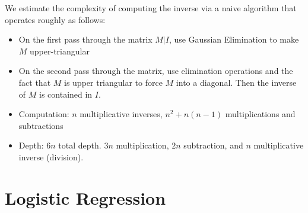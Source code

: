 We estimate the complexity of computing the inverse via a naive algorithm that operates roughly as follows:
\begin{itemize}
	\item On the first pass through the matrix $M | I$, use Gaussian Elimination to make $M$ upper-triangular
	\item On the second pass through the matrix, use elimination operations and the fact that $M$ is upper triangular  to force $M$ into a diagonal. Then the inverse of $M$ is contained in $I$.
\end{itemize}


\begin{itemize}
	\item Computation: $n$ multiplicative inverses, $n^{2}+n(n-1)$ multiplications and subtractions
	\item Depth: $6n$ total depth. $3n$ multiplication, $2n$ subtraction, and $n$ multiplicative inverse (division).
\end{itemize}


\section{Logistic Regression}

